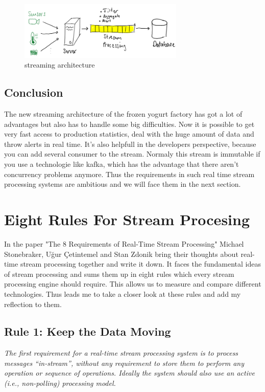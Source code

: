 \begin{figure}[H]
\centering
\captionsetup{justification=centering}
\includegraphics[width=0.7\textwidth]{images/stream.png}
\caption[streaming architecture]{streaming architecture}
\end{figure}

\newpage

\subsection{Conclusion}
The new streaming architecture of the frozen yogurt factory has got a lot of advantages but also has to handle some big difficulties.
Now it is possible to get very fast access to production statistics, deal with the huge amount of data and throw alerts in real time.
It's also helpfull in the developers perspective, because you can add several consumer to the stream.
Normaly this stream is immutable if you use a technologie like kafka, which has the advantage that there aren't concurrency problems anymore.
Thus the requirements in such real time stream processing systems are ambitious and we will face them in the next section.

\newpage

\section{Eight Rules For Stream Procesing}
In the paper "The 8 Requirements of Real-Time Stream Processing" Michael Stonebraker, Uğur Çetintemel and Stan Zdonik
bring their thoughts about real-time stream processing together and write it down. It faces the fundamental ideas of stream processing
and sums them up in eight rules which every stream processing engine should require.
This allows us to measure and compare different technologies.
Thus leads me to take a closer look at these rules and add my reflection to them.

\subsection{Rule 1: Keep the Data Moving}
\textit{The first requirement for a real-time stream processing
        system is to process messages “in-stream”, without any
        requirement to store them to perform any operation or
        sequence of operations. Ideally the system should also use
        an active (i.e., non-polling) processing model.}

